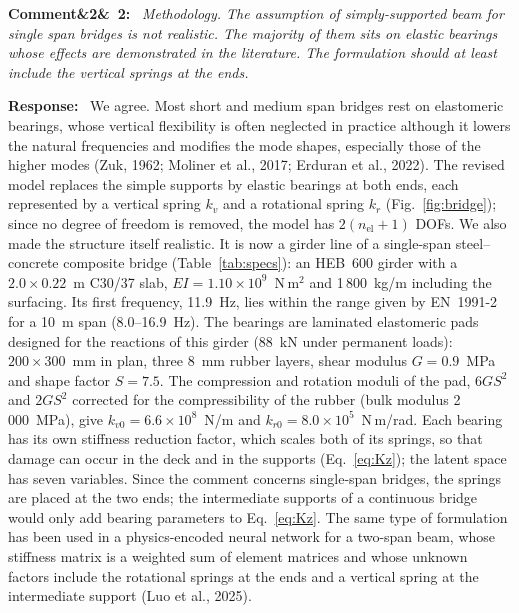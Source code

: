 \documentclass[11pt]{article}
\newenvironment{rcomment}[1]{\par\bigskip\noindent\textbf{Comment\ifx&#1&\else\ #1\fi:}\ \itshape}{\par}
\newenvironment{response}{\par\smallskip\noindent\color{resp}\textbf{Response:}\ }{\par}
\begin{document}
\begin{rcomment}{2}
Methodology. The assumption of simply-supported beam for single span bridges is not realistic. The majority of them
sits on elastic bearings whose effects are demonstrated in the literature. The formulation should at least include the
vertical springs at the ends.
\end{rcomment}

\begin{response}
We agree. Most short and medium span bridges rest on elastomeric bearings, whose vertical flexibility is often neglected
in practice although it lowers the natural frequencies and modifies the mode shapes, especially those of the higher
modes (Zuk, 1962; Moliner et al., 2017; Erduran et al., 2022). The revised model replaces the simple supports by elastic
bearings at both ends, each represented by a
vertical spring $k_v$ and a rotational spring $k_r$ (Fig.~\ref{fig:bridge}); since no degree of freedom is removed, the
model has $2(n_{\mathrm{el}}+1)$ DOFs. We also made the structure itself realistic. It is now a girder line of a
single-span steel--concrete composite bridge (Table~\ref{tab:specs}): an HEB~600 girder with a $2.0\times0.22$~m C30/37
slab, $EI=1.10\times10^{9}$~N\,m$^2$ and 1\,800~kg/m including the surfacing. Its first frequency, 11.9~Hz, lies within
the range given by EN~1991-2 for a 10~m span (8.0--16.9~Hz). The bearings are laminated elastomeric pads designed for the
reactions of this girder (88~kN under permanent loads): $200\times300$~mm in plan, three 8~mm rubber layers, shear
modulus $G=0.9$~MPa and shape factor $S=7.5$. The compression and rotation moduli of the pad, $6GS^2$ and $2GS^2$
corrected for the compressibility of the rubber (bulk modulus 2\,000~MPa), give $k_{v0}=6.6\times10^{8}$~N/m and
$k_{r0}=8.0\times10^{5}$~N\,m/rad. Each bearing has its own stiffness reduction factor, which scales both of its springs,
so that damage can occur in the deck and in the supports (Eq.~\eqref{eq:Kz}); the latent space has seven variables.
Since the comment concerns single-span bridges, the springs are placed at the two ends; the intermediate supports of a
continuous bridge would only add bearing parameters to Eq.~\eqref{eq:Kz}. The same type of formulation has been used in a
physics-encoded neural network for a two-span beam, whose stiffness matrix is a weighted sum of element matrices and whose
unknown factors include the rotational springs at the ends and a vertical spring at the intermediate support (Luo et al.,
2025).


\end{response}
\end{document}
